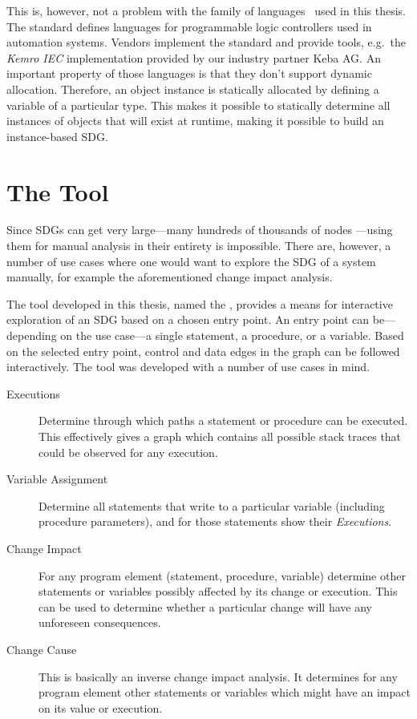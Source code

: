 This is, however, not a problem with the \IEC family of languages~\cite{IEC61131:2003} used in this thesis. The \IEC 
standard defines languages for programmable logic controllers used in automation systems. Vendors implement the 
standard and provide tools, e.g.\ the \emph{Kemro IEC} implementation provided by our industry partner Keba AG. An 
important property of those languages is that they don't support dynamic allocation. Therefore, an object instance is 
statically allocated by defining a variable of a particular type. This makes it possible to statically determine all 
instances of objects that will exist at runtime, making it possible to build an instance-based SDG.


\section{The Tool} \label{sec:intro-tool}

Since SDGs can get very large---many hundreds of thousands of nodes 
\cite[sec.~4.3]{DBLP:conf/splc/AngererPLGG14}---using them for manual analysis in their entirety is impossible. There 
are, however, a number of use cases where one would want to explore the SDG of a system manually, for example the 
aforementioned change impact analysis.

The tool developed in this thesis, named the \emph{\SB}, provides a means for interactive exploration of an SDG based 
on a chosen entry point. An entry point can be---depending on the use case---a single statement, a procedure, or a 
variable. Based on the selected entry point, control and data edges in the graph can be followed interactively. The 
tool was developed with a number of use cases in mind.

\begin{description}
  \item[Executions] Determine through which paths a statement or procedure can be executed. This effectively gives a 
  graph which contains all possible stack traces that could be observed for any execution.
  
  \item[Variable Assignment] Determine all statements that write to a particular variable (including procedure 
  parameters), and for those statements show their \emph{Executions}.
  
  \item[Change Impact] For any program element (statement, procedure, variable) determine other statements or variables 
  possibly affected by its change or execution. This can be used to determine whether a particular change will have any 
  unforeseen consequences.
  
  \item[Change Cause] This is basically an inverse change impact analysis. It determines for any program element
  other statements or variables which might have an impact on its value or execution.
\end{description}

